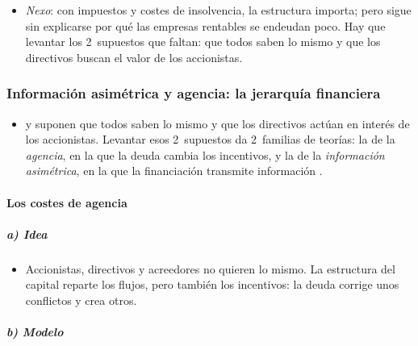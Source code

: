 \documentclass[11pt]{article}
\begin{document}
\begin{itemize}
\item \emph{Nexo}: con impuestos y costes de insolvencia, la estructura importa; pero sigue sin explicarse por qué las empresas rentables se endeudan poco. Hay que levantar los 2~supuestos que faltan: que todos saben lo mismo y que los directivos buscan el valor de los accionistas.
\end{itemize}

\subsubsection{Información asimétrica y agencia: la jerarquía financiera}\label{sec:informacion}

\begin{itemize}
\item {} y  suponen que todos saben lo mismo y que los directivos actúan en interés de los accionistas. Levantar esos 2~supuestos da 2~familias de teorías: la de la \emph{agencia}, en la que la deuda cambia los incentivos, y la de la \emph{información asimétrica}, en la que la financiación transmite información .
\end{itemize}

\paragraph{Los costes de agencia}

\subparagraph{a) Idea}

\begin{itemize}
\item Accionistas, directivos y acreedores no quieren lo mismo. La estructura del capital reparte los flujos, pero también los incentivos: la deuda corrige unos conflictos y crea otros\nocite{JensenMeckling1976Theory}.
\end{itemize}

\subparagraph{b) Modelo}
\end{document}
